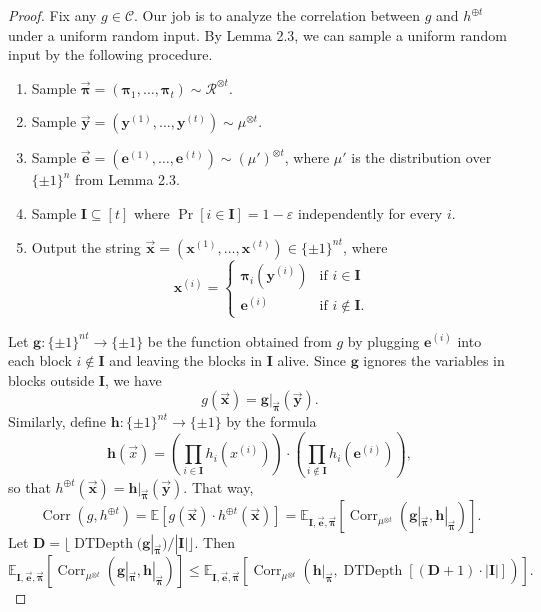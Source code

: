 \documentclass[10pt,a4paper]{article}
\newcommand{\Corr}{\operatorname{Corr}}
\newcommand{\DT}{\operatorname{DTDepth}}
\begin{document}
\begin{proof}
Fix any $g\in\mathcal C$. Our job is to analyze the correlation between $g$ and $h^{\oplus t}$ under a uniform random input. By Lemma 2.3, we can sample a uniform random input by the following procedure.
\begin{enumerate}
\item Sample $\vec{\boldsymbol\pi}=(\boldsymbol\pi_1,\ldots,\boldsymbol\pi_t)\sim\mathcal R^{\otimes t}$.
\item Sample $\vec{\mathbf y}=(\mathbf y^{(1)},\ldots,\mathbf y^{(t)})\sim\mu^{\otimes t}$.
\item Sample $\vec{\mathbf e}=(\mathbf e^{(1)},\ldots,\mathbf e^{(t)})\sim(\mu')^{\otimes t}$, where $\mu'$ is the distribution over $\{\pm1\}^n$ from Lemma 2.3.
\item Sample $\mathbf I\subseteq[t]$ where $\Pr[i\in\mathbf I]=1-\varepsilon$ independently for every $i$.
\item Output the string $\vec{\mathbf x}=(\mathbf x^{(1)},\ldots,\mathbf x^{(t)})\in\{\pm1\}^{nt}$, where
\[\mathbf x^{(i)}=\begin{cases}\boldsymbol\pi_i(\mathbf y^{(i)})&\text{if }i\in\mathbf I\\\mathbf e^{(i)}&\text{if }i\notin\mathbf I.\end{cases}\]
\end{enumerate}
Let $\mathbf g:\{\pm1\}^{nt}\to\{\pm1\}$ be the function obtained from $g$ by plugging $\mathbf e^{(i)}$ into each block $i\notin\mathbf I$ and leaving the blocks in $\mathbf I$ alive. Since $\mathbf g$ ignores the variables in blocks outside $\mathbf I$, we have
\[g(\vec{\mathbf x})=\mathbf g|_{\vec{\boldsymbol\pi}}(\vec{\mathbf y}).\]
Similarly, define $\mathbf h:\{\pm1\}^{nt}\to\{\pm1\}$ by the formula
\[\mathbf h(\vec x)=\left(\prod_{i\in\mathbf I}h_i(x^{(i)})\right)\cdot\left(\prod_{i\notin\mathbf I}h_i(\mathbf e^{(i)})\right),\]
so that $h^{\oplus t}(\vec{\mathbf x})=\mathbf h|_{\vec{\boldsymbol\pi}}(\vec{\mathbf y})$. That way,
\[\Corr(g,h^{\oplus t})=\mathbb E[g(\vec{\mathbf x})\cdot h^{\oplus t}(\vec{\mathbf x})]=\mathbb E_{\mathbf I,\vec{\mathbf e},\vec{\boldsymbol\pi}}[\Corr_{\mu^{\otimes t}}(\mathbf g|_{\vec{\boldsymbol\pi}},\mathbf h|_{\vec{\boldsymbol\pi}})].\]
Let $\mathbf D=\lfloor\DT(\mathbf g|_{\vec{\boldsymbol\pi}})/|\mathbf I|\rfloor$. Then
\[\mathbb E_{\mathbf I,\vec{\mathbf e},\vec{\boldsymbol\pi}}[\Corr_{\mu^{\otimes t}}(\mathbf g|_{\vec{\boldsymbol\pi}},\mathbf h|_{\vec{\boldsymbol\pi}})]\le\mathbb E_{\mathbf I,\vec{\mathbf e},\vec{\boldsymbol\pi}}[\Corr_{\mu^{\otimes t}}(\mathbf h|_{\vec{\boldsymbol\pi}},\DT[(\mathbf D+1)\cdot|\mathbf I|])].\]

\end{proof}
\end{document}
